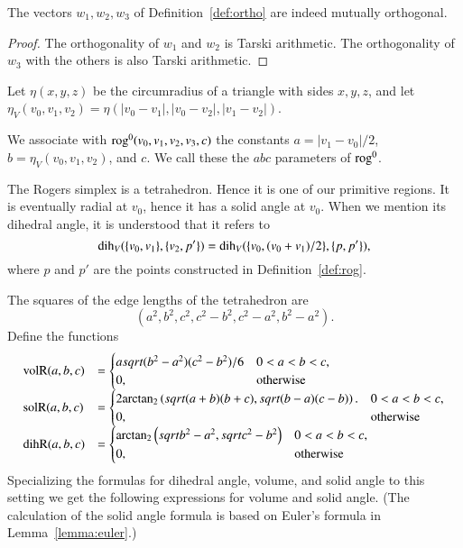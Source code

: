 \begin{lemma} The vectors $w_1,w_2,w_3$ of Definition~\ref{def:ortho}
are indeed mutually orthogonal.
\end{lemma}

\begin{proof} The orthogonality of $w_1$ and $w_2$ is 
Tarski arithmetic.  The orthogonality of $w_3$ with the
others is also Tarski arithmetic.
\end{proof}

\begin{definition}\label{def:etaV}
Let $\eta(x,y,z)$ be the circumradius of a triangle with sides
$x,y,z$, and let $\eta_V(v_0,v_1,v_2) = \eta(|v_0-v_1|,|v_0-v_2|,|v_1-v_2|)$.
\end{definition}

\begin{definition}
We associate with ${\operatorname{rog}}^0(v_0,v_1,v_2,v_3,c)$ the constants
$a=|v_1-v_0|/2$, $b=\eta_V(v_0,v_1,v_2)$, and $c$.
We call these the $abc$ parameters of ${\operatorname{rog}}^0$. 
\end{definition}

The Rogers simplex is a tetrahedron.  Hence it is one of our
primitive regions.  It is eventually radial at $v_0$, hence
it has a solid angle at $v_0$.  When we mention its dihedral
angle, it is understood that it refers to 
   $$
   \operatorname{dih}_V(\{v_0,v_1\},\{v_2,p'\})=\operatorname{dih}_V(\{v_0,(v_0+v_1)/2\},\{p,p'\}),
   $$
where $p$ and $p'$ are the points 
constructed in Definition~\ref{def:rog}.

The squares of the edge lengths of the tetrahedron are
   $$
   (a^2,b^2,c^2,c^2-b^2,c^2-a^2,b^2-a^2).
   $$
Define the functions
   $$
   \begin{array}{lll}
     {\operatorname{volR}}(a,b,c) &= \begin{cases}
       asqrt{(b^2-a^2)(c^2-b^2)}/6& 0 < a < b < c,\\
       0,&\text{otherwise}
       \end{cases}\\
     {\operatorname{solR}}(a,b,c) &= \begin{cases}
      2 {\operatorname{arctan_2}}\left(sqrt{{(a+b)(b+c)}},
         sqrt{{(b-a) (c-b)}}\right).& 0 < a < b < c,\\
      0,&\text{otherwise}
     \end{cases}\\
     {\operatorname{dihR}}(a,b,c) &= \begin{cases}
      {\operatorname{arctan\ensuremath{_2}}}\left(sqrt{b^2 - a^2},sqrt{c^2 - b^2}\right)
      & 0 < a < b < c,\\
      0,&\text{otherwise}
     \end{cases}
     \end{array}
   $$
Specializing the formulas for dihedral angle, volume, and solid angle to this
setting we get the following expressions for volume and solid angle.
(The calculation of the
 solid angle formula is based on Euler's formula in 
Lemma~\ref{lemma:euler}.)

